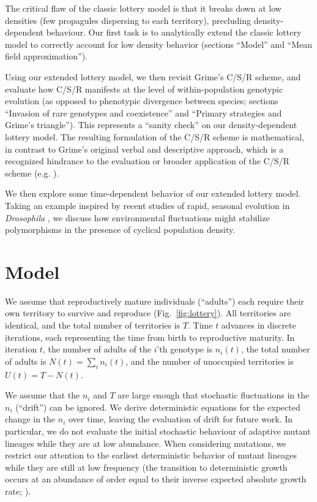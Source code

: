 \documentclass[11pt]{article}
\begin{document}
The critical flaw of the classic lottery model is that it breaks down at low densities (few propagules dispersing to each territory), precluding density-dependent behaviour. Our first task is to analytically extend the classic lottery model to correctly account for low density behavior (sections ``Model'' and ``Mean field approximation'').

Using our extended lottery model, we then revisit Grime's C/S/R scheme,  and evaluate how C/S/R manifests at the level of within-population genotypic evolution (as opposed to phenotypic divergence between species; sections ``Invasion of rare genotypes and coexistence'' and ``Primary strategies and Grime's triangle''). This represents a ``sanity check'' on our density-dependent lottery model. The resulting formulation of the C/S/R scheme is mathematical, in contrast to Grime's original verbal and descriptive approach, which is a recognized hindrance to the evaluation or broader application of the C/S/R scheme (e.g. \citealt{tilman_2007}).

We then explore some time-dependent behavior of our extended lottery model. Taking an example inspired by recent studies of rapid, seasonal evolution in \textit{Drosophila} \citep{bergland_14}, we discuss how environmental fluctuations might stabilize polymorphisms in the presence of cyclical population density. 

 
\section*{Model}\label{sec:model}

We assume that reproductively mature individuals (``adults'') each require their own territory to survive and reproduce (Fig.~\ref{fig:lottery}). All territories are identical, and the total number of territories is $T$. Time $t$ advances in discrete iterations, each representing the time from birth to reproductive maturity. In iteration $t$, the number of adults of the $i$'th genotype is $n_i(t)$, the total number of adults is $N(t)=\sum_i n_i(t)$, and the number of unoccupied territories is $U(t)=T-N(t)$. 

We assume that the $n_i$ and $T$ are large enough that stochastic fluctuations in the $n_i$ (``drift'') can be ignored. We derive deterministic equations for the expected change in the $n_i$ over time, leaving the evaluation of drift for future work. In particular, we do not evaluate the initial stochastic behaviour of adaptive mutant lineages while they are at low abundance. When considering mutations, we restrict our attention to the earliest deterministic behavior of mutant lineages while they are still at low frequency (the transition to deterministic growth occurs at an abundance of order equal to their inverse expected absolute growth rate; \citealt{uecker_2011}).
\end{document}
